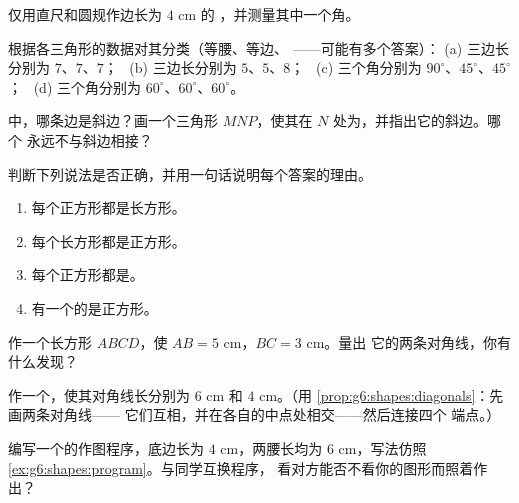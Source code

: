 \begin{exercise}[$\star$]\label{exo:g6:shapes:3}
仅用直尺和圆规作边长为 $4$ cm 的
，并测量其中一个角。
\end{exercise}

\begin{exercise}[$\star$]\label{exo:g6:shapes:4}
根据各三角形的数据对其分类（等腰、等边、
——可能有多个答案）：
(a) 三边长分别为 $7$、$7$、$7$； \
(b) 三边长分别为 $5$、$5$、$8$； \
(c) 三个角分别为 $90^\circ$、$45^\circ$、$45^\circ$； \
(d) 三个角分别为 $60^\circ$、$60^\circ$、$60^\circ$。
\end{exercise}

\begin{exercise}[$\star$]\label{exo:g6:shapes:5}
中，哪条边是斜边？画一个三角形
$MNP$，使其在 $N$ 处为，并指出它的斜边。哪个
永远不与斜边相接？
\end{exercise}

\begin{exercise}[$\star$]\label{exo:g6:shapes:6}
判断下列说法是否正确，并用一句话说明每个答案的理由。
\begin{enumerate}
  \item 每个正方形都是长方形。
  \item 每个长方形都是正方形。
  \item 每个正方形都是。
  \item 有一个的是正方形。
\end{enumerate}
\end{exercise}

\begin{exercise}[$\star$]\label{exo:g6:shapes:7}
作一个长方形 $ABCD$，使 $AB = 5$ cm，$BC = 3$ cm。量出
它的两条对角线，你有什么发现？
\end{exercise}

\begin{exercise}[$\star$]\label{exo:g6:shapes:8}
作一个，使其对角线长分别为 $6$ cm 和 $4$ cm。（用
\cref{prop:g6:shapes:diagonals}：先画两条对角线——
它们互相\omterm{def:g6:lines:perp}{垂直}，并在各自的中点处相交——然后连接四个
端点。）
\end{exercise}

\begin{exercise}[$\star\star$]\label{exo:g6:shapes:9}
编写一个的作图程序，底边长为
$4$ cm，两腰长均为 $6$ cm，写法仿照
\cref{ex:g6:shapes:program}。与同学互换程序，
看对方能否不看你的图形而照着作出？
\end{exercise}

